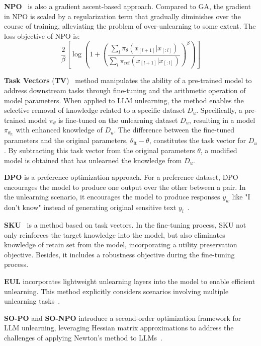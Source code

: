 \documentclass{article}
\theoremstyle{plain}
\theoremstyle{definition}
\theoremstyle{remark}
\begin{document}
\textbf{NPO}~\cite{DBLP:journals/corr/abs-2404-05868} is also a gradient ascent-based approach. Compared to GA, the gradient in NPO is scaled by a regularization term that gradually diminishes over the course of training, alleviating the problem of over-unlearning to some extent. The loss objective of NPO is:
\begin{equation}
    \frac{2}{\beta}\left[\log\left(1+\left(\frac{\sum_{l}\pi_\theta(x_{[l+1]}|x_{[:l]})}{\sum_{l}\pi_\text{ref}(x_{[l+1]}|x_{[:l]})}\right)^\beta\right)\right]
\end{equation}

\textbf{Task Vectors} (\textbf{TV})~\cite{DBLP:conf/iclr/IlharcoRWSHF23} method manipulates the ability of a pre-trained model to address downstream tasks through fine-tuning and the arithmetic operation of model parameters.
When applied to LLM unlearning, the method enables the selective removal of knowledge related to a specific dataset $D_u$.
Specifically, a pre-trained model $\pi_{\theta}$ is fine-tuned on the unlearning dataset $D_u$, resulting in a model $\pi_{\theta_{\text{ft}}}$ with enhanced knowledge of $D_u$. The difference between the fine-tuned parameters and the original parameters, $\theta_{\text{ft}}-\theta$, constitutes the task vector for $D_u$.
By subtracting this task vector from the original parameters $\theta$, a modified model is obtained that has unlearned the knowledge from $D_u$.

\textbf{DPO} is a preference optimization approach.
For a preference dataset, DPO encourages the model to produce one output over the other between a pair.
In the unlearning scenario, it encourages the model to produce responses $y_w$ like "I don't know" instead of generating original sensitive text $y_l$~\cite{DBLP:journals/corr/abs-2404-05868}.


\textbf{SKU}~\cite{DBLP:conf/acl/0010DT0024} is a method based on task vectors.
In the fine-tuning process, SKU not only reinforces the target knowledge into the model, but also eliminates knowledge of retain set from the model, incorporating a utility preservation objective.
Besides, it includes a robustness objective during the fine-tuning process.

\textbf{EUL} incorporates lightweight unlearning layers into the model to enable efficient unlearning. This method explicitly considers scenarios involving multiple unlearning tasks~\cite{DBLP:conf/emnlp/ChenY23}.

\textbf{SO-PO} and \textbf{SO-NPO} introduce a second-order optimization framework for LLM unlearning, leveraging Hessian matrix approximations to address the challenges of applying Newton's method to LLMs~\cite{DBLP:conf/emnlp/JiaZZLRDK024}.
\end{document}
